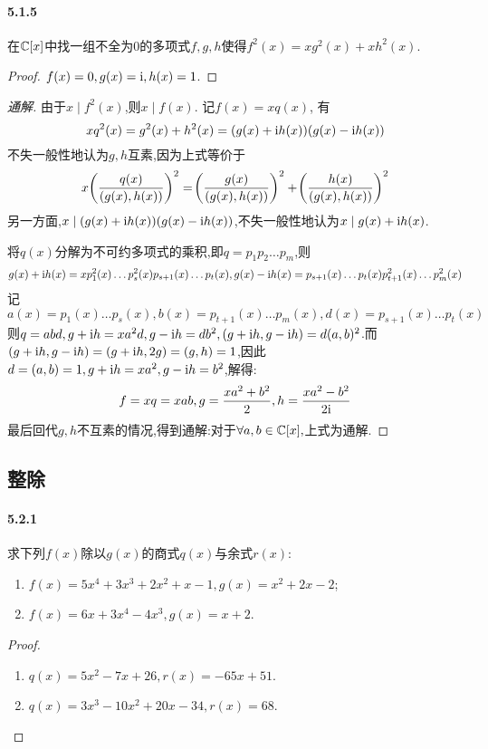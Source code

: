 \documentclass[11pt]{article}
\begin{document}
\paragraph{5.1.5}在$\mathbb{C}[x]$中找一组不全为0的多项式$f,g,h$使得$f^2(x)=xg^2(x)+xh^2(x)$.
\begin{proof}
    $f(x)=0, g(x)=\mathrm{i}, h(x)=1$.
\end{proof}
\begin{proof}[通解]
    由于$x\mid f^2(x)$,则$x\mid f(x)$. 记$f(x)=xq(x)$, 有
    $$xq^2(x)=g^2(x)+h^2(x)=(g(x)+\mathrm{i} h(x))(g(x)-\mathrm{i} h(x))$$
    不失一般性地认为$g,h$互素,因为上式等价于
    $$x\!\left(\frac{q(x)}{(g(x),h(x))}\right)^2=\!\left(\frac{g(x)}{(g(x),h(x))}\right)^2+\!\left(\frac{h(x)}{(g(x),h(x))}\right)^2$$
    另一方面,$x\mid (g(x)+\mathrm{i} h(x))(g(x)-\mathrm{i} h(x))$,不失一般性地认为$x\mid g(x)+\mathrm{i} h(x)$.
    
    将$q(x)$分解为不可约多项式的乘积,即$q=p_1p_2\dots p_m$,则
    $$g(x)+\mathrm{i} h(x)=xp_1^2(x)\dots p_{s}^2(x) p_{s+1}(x)\dots p_{t}(x), g(x)-\mathrm{i} h(x)=p_{s+1}(x)\dots p_{t}(x)p_{t+1}^2(x)\dots p_{m}^2(x)$$
    记
    $$a(x)=p_1(x)\dots p_{s}(x), b(x)=p_{t+1}(x)\dots p_{m}(x), d(x)=p_{s+1}(x)\dots p_{t}(x)$$
    则$q=abd, g+\mathrm{i} h=x a^2d, g-\mathrm{i} h=db^2, (g+\mathrm{i} h, g-\mathrm{i} h)=d(a,b)^2$.而
    $(g+\mathrm{i} h, g-\mathrm{i} h)=(g+\mathrm{i} h, 2g)=(g,h)=1$,因此$d=(a,b)=1, g+\mathrm{i} h=x a^2, g-\mathrm{i} h=b^2$,解得:
    $$f=xq=xab, g=\frac{x a^2+b^2}{2}, h=\frac{x a^2-b^2}{2\mathrm{i}}$$
    最后回代$g,h$不互素的情况,得到通解:对于$\forall a,b\in \mathbb{C}[x],$上式为通解.
\end{proof}

\subsection{整除}
\paragraph{5.2.1}求下列$f(x)$除以$g(x)$的商式$q(x)$与余式$r(x)$:
\begin{enumerate}
    \item $f(x)=5x^4+3x^3+2x^2+x-1, g(x)=x^2+2x-2$;
    \item $f(x)=6x+3x^4-4x^3, g(x)=x+2$.
\end{enumerate}
\begin{proof}
    \begin{enumerate}
        \item $q(x)=5 x^2-7x+26, r(x)=-65x+51$.
        \item $q(x)=3 x^3-10  x^2+20  x-34, r(x)=68$.
    \end{enumerate}
\end{proof}
\end{document}

